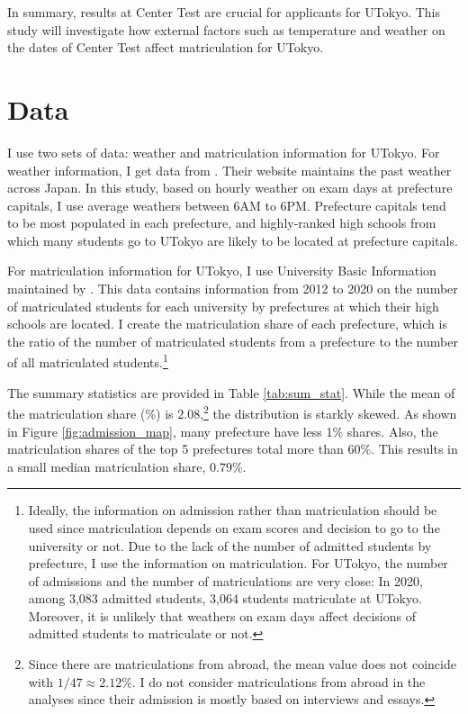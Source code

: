 \documentclass[12pt,letterpaper]{article}
\begin{document}
In summary, results at Center Test are crucial for applicants for UTokyo.
This study will investigate how external factors such as temperature and weather on the dates of Center Test affect matriculation for UTokyo.

\section{Data}\label{sec:data}

I use two sets of data: weather and matriculation information for UTokyo.
For weather information, I get data from .
Their website maintains the past weather across Japan.
In this study, based on hourly weather on exam days at prefecture capitals, I use average weathers between 6AM to 6PM.
Prefecture capitals tend to be most populated in each prefecture, and highly-ranked high schools from which many students go to UTokyo are likely to be located at prefecture capitals.

For matriculation information for UTokyo, I use University Basic Information maintained by .
This data contains information from 2012 to 2020 on the number of matriculated students for each university by prefectures at which their high schools are located.
I create the matriculation share of each prefecture, which is the ratio of the number of matriculated students from a prefecture to the number of all matriculated students.\footnote{
  Ideally, the information on admission rather than matriculation should be used since matriculation depends on exam scores and decision to go to the university or not.
  Due to the lack of the number of admitted students by prefecture, I use the information on matriculation.
  For UTokyo, the number of admissions and the number of matriculations are very close:
  In 2020, among 3,083 admitted students, 3,064 students matriculate at UTokyo.
  Moreover, it is unlikely that weathers on exam days affect decisions of admitted students to matriculate or not.
}

The summary statistics are provided in Table \ref{tab:sum_stat}.
While the mean of the matriculation share (\%) is $2.08$,\footnote{
  Since there are matriculations from abroad, the mean value does not coincide with $1 / 47 \approx 2.12\%$.
  I do not consider matriculations from abroad in the analyses since their admission is mostly based on interviews and essays.
} the distribution is starkly skewed.
As shown in Figure \ref{fig:admission_map}, many prefecture have less 1\% shares.
Also, the matriculation shares of the top 5 prefectures total more than 60\%.
This results in a small median matriculation share, $0.79 \%$.
\end{document}
